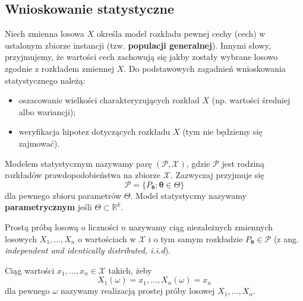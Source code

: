 \documentclass{myclass}
\numberwithin{equation}{section}
\begin{document}
\subsection{Wnioskowanie statystyczne}

Niech zmienna losowa \(X\) określa model rozkładu pewnej cechy (cech) w ustalonym zbiorze instancji
(tzw. \textbf{populacji generalnej}). Innymi słowy, przyjmujemy, że wartości cech zachowują się
jakby zostały wybrane losowo zgodnie z rozkładem zmiennej \(X\). Do podstawowych zagadnień
wnioskowania statystycznego należą:
\begin{itemize}

    \item oszacowanie wielkości charakteryzujących rozkład \(X\) (np. wartości średniej albo
    wariancji);

    \item weryfikacja hipotez dotyczących rozkładu \(X\) (tym nie będziemy się zajmować).
    
\end{itemize}

\begin{definition}
Modelem statystycznym nazywamy parę \((\mathcal{P}, \mathcal{X})\), gdzie \(\mathcal{P}\) jest
rodziną rozkładów prawdopodobieństwa na zbiorze \(\mathcal{X}\). Zazwyczaj przyjmuje się
\begin{equation*}
    \mathcal{P} = \{P_{\boldsymbol{\theta}} : \boldsymbol{\theta} \in \Theta \} 
\end{equation*}
dla pewnego zbioru parametrów \(\Theta\). Model statystyczny nazywamy \textbf{parametrycznym} jeśli
\(\Theta \subset \mathbb{R}^k\).
\end{definition}

\begin{definition}
Prostą próbą losową o liczności \(n\) nazywamy ciąg niezależnych zmiennych losowych
\(X_1,\ldots,X_n\) o wartościach w \(\mathcal{X}\) i o tym samym rozkładzie
\(P_{\boldsymbol{\theta}} \in \mathcal{P}\) (z ang. \textit{independent and identically distributed,
i.i.d}).
\end{definition}

\begin{definition}
Ciąg wartości \(x_1,\ldots,x_n \in \mathcal{X}\) takich, żeby
\begin{equation*}
    X_1(\omega) = x_1,\ldots,X_n(\omega) = x_n
\end{equation*}
dla pewnego \(\omega\) nazywamy realizacją prostej próby losowej \(X_1,\ldots,X_n\).
\end{definition}
\end{document}
